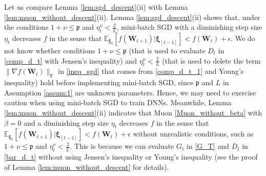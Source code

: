 \documentclass[twoside,11pt]{article}
\begin{document}
Let us compare Lemma \ref{lem:sgd_descent}(ii) with Lemma \ref{lem:muon_without_descent}(ii). Lemma \ref{lem:sgd_descent}(ii) shows that, under the conditions $1 + \nu \leq \mathfrak{p}$ and $\eta_t^{\nu} < \frac{2}{L}$, mini-batch SGD with a diminishing step size $\eta_t$ decreases $f$ in the sense that $\mathbb{E}_{\bm{\xi}_t} [f (\bm{W}_{t+1}) |\bm{\xi}_{[t-1]} ] < f(\bm{W}_t) + \epsilon$. We do not know whether conditions $1 + \nu \leq \mathfrak{p}$ (that is used to evaluate $D_t$ in \eqref{comp_d_t} with Jensen's inequality) and $\eta_t^{\nu} < \frac{2}{L}$ (that is used to delete the term $\| \nabla f (\bm{W}_t)\|_{\mathrm{F}}$ in \eqref{ineq_sgd} that comes from \eqref{comp_d_t_1} and Young's inequality) hold before implementing mini-batch SGD, since $\mathfrak{p}$ and $L$ in Assumption \ref{assum:1} are unknown parameters. Hence, we may need to exercise caution when using mini-batch SGD to train DNNs. Meanwhile, Lemma \ref{lem:muon_without_descent}(ii) indicates that Muon \eqref{Muon_without_beta} with $\beta = 0$ and a diminishing step size $\eta_t$ decreases $f$ in the sense that $\mathbb{E}_{\bm{\xi}_t} [f (\bm{W}_{t+1}) |\bm{\xi}_{[t-1]} ] < f(\bm{W}_t) + \epsilon$ without unrealistic conditions, such as $1 + \nu \leq \mathfrak{p}$ and $\eta_t^{\nu} < \frac{2}{L}$. This is because we can evaluate $G_t$ in \eqref{G_T} and $\overline{D}_t$ in \eqref{bar_d_t} without using Jensen's inequality or Young's inequality (see the proof of Lemma \ref{lem:muon_without_descent} for details). 
\end{document}
